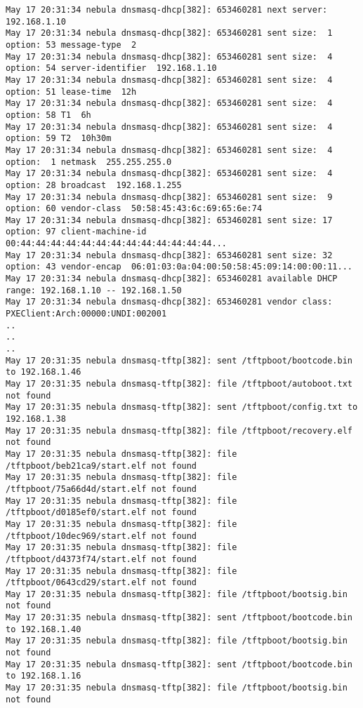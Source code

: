\begin{lstlisting}
May 17 20:31:34 nebula dnsmasq-dhcp[382]: 653460281 next server: 192.168.1.10
May 17 20:31:34 nebula dnsmasq-dhcp[382]: 653460281 sent size:  1 option: 53 message-type  2
May 17 20:31:34 nebula dnsmasq-dhcp[382]: 653460281 sent size:  4 option: 54 server-identifier  192.168.1.10
May 17 20:31:34 nebula dnsmasq-dhcp[382]: 653460281 sent size:  4 option: 51 lease-time  12h
May 17 20:31:34 nebula dnsmasq-dhcp[382]: 653460281 sent size:  4 option: 58 T1  6h
May 17 20:31:34 nebula dnsmasq-dhcp[382]: 653460281 sent size:  4 option: 59 T2  10h30m
May 17 20:31:34 nebula dnsmasq-dhcp[382]: 653460281 sent size:  4 option:  1 netmask  255.255.255.0
May 17 20:31:34 nebula dnsmasq-dhcp[382]: 653460281 sent size:  4 option: 28 broadcast  192.168.1.255
May 17 20:31:34 nebula dnsmasq-dhcp[382]: 653460281 sent size:  9 option: 60 vendor-class  50:58:45:43:6c:69:65:6e:74
May 17 20:31:34 nebula dnsmasq-dhcp[382]: 653460281 sent size: 17 option: 97 client-machine-id  00:44:44:44:44:44:44:44:44:44:44:44:44:44...
May 17 20:31:34 nebula dnsmasq-dhcp[382]: 653460281 sent size: 32 option: 43 vendor-encap  06:01:03:0a:04:00:50:58:45:09:14:00:00:11...
May 17 20:31:34 nebula dnsmasq-dhcp[382]: 653460281 available DHCP range: 192.168.1.10 -- 192.168.1.50
May 17 20:31:34 nebula dnsmasq-dhcp[382]: 653460281 vendor class: PXEClient:Arch:00000:UNDI:002001
..
..
..
May 17 20:31:35 nebula dnsmasq-tftp[382]: sent /tftpboot/bootcode.bin to 192.168.1.46
May 17 20:31:35 nebula dnsmasq-tftp[382]: file /tftpboot/autoboot.txt not found
May 17 20:31:35 nebula dnsmasq-tftp[382]: sent /tftpboot/config.txt to 192.168.1.38
May 17 20:31:35 nebula dnsmasq-tftp[382]: file /tftpboot/recovery.elf not found
May 17 20:31:35 nebula dnsmasq-tftp[382]: file /tftpboot/beb21ca9/start.elf not found
May 17 20:31:35 nebula dnsmasq-tftp[382]: file /tftpboot/75a66d4d/start.elf not found
May 17 20:31:35 nebula dnsmasq-tftp[382]: file /tftpboot/d0185ef0/start.elf not found
May 17 20:31:35 nebula dnsmasq-tftp[382]: file /tftpboot/10dec969/start.elf not found
May 17 20:31:35 nebula dnsmasq-tftp[382]: file /tftpboot/d4373f74/start.elf not found
May 17 20:31:35 nebula dnsmasq-tftp[382]: file /tftpboot/0643cd29/start.elf not found
May 17 20:31:35 nebula dnsmasq-tftp[382]: file /tftpboot/bootsig.bin not found
May 17 20:31:35 nebula dnsmasq-tftp[382]: sent /tftpboot/bootcode.bin to 192.168.1.40
May 17 20:31:35 nebula dnsmasq-tftp[382]: file /tftpboot/bootsig.bin not found
May 17 20:31:35 nebula dnsmasq-tftp[382]: sent /tftpboot/bootcode.bin to 192.168.1.16
May 17 20:31:35 nebula dnsmasq-tftp[382]: file /tftpboot/bootsig.bin not found

\end{lstlisting}
